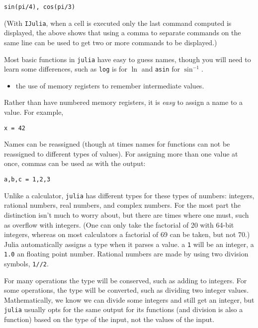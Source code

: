 \documentclass[12pt]{article}
\begin{document}
\begin{verbatim}
sin(pi/4), cos(pi/3)
\end{verbatim}
(With \texttt{IJulia}, when a cell is executed only the last command
computed is displayed, the above shows that using a comma to separate
commands on the same line can be used to get two or more commands to be
displayed.)

Most basic functions in \texttt{julia} have easy to guess names, though
you will need to learn some differences, such as \texttt{log} is for
$\ln$ and \texttt{asin} for $\sin^{-1}$.

\begin{itemize}
\itemsep1pt\parskip0pt
\item
  the use of memory registers to remember intermediate values.
\end{itemize}

Rather than have numbered memory registers, it is \emph{easy} to assign
a name to a value. For example,



\begin{verbatim}
x = 42
\end{verbatim}
Names can be reassigned (though at times names for functions can not be
reassigned to different types of values). For assigning more than one
value at once, commas can be used as with the output:



\begin{verbatim}
a,b,c = 1,2,3
\end{verbatim}
Unlike a calculator, \texttt{julia} has different types for these types
of numbers: integers, rational numbers, real numbers, and complex
numbers. For the most part the distinction isn't much to worry about,
but there are times where one must, such as overflow with integers. (One
can only take the factorial of 20 with 64-bit integers, whereas on most
calculators a factorial of 69 can be taken, but not 70.) Julia
automatically assigns a type when it parses a value. a \texttt{1} will
be an integer, a \texttt{1.0} an floating point number. Rational numbers
are made by using two division symbols, \texttt{1//2}.

For many operations the type will be conserved, such as adding to
integers. For some operations, the type will be converted, such as
dividing two integer values. Mathematically, we know we can divide some
integers and still get an integer, but \texttt{julia} usually opts for
the same output for its functions (and division is also a function)
based on the type of the input, not the values of the input.
\end{document}
